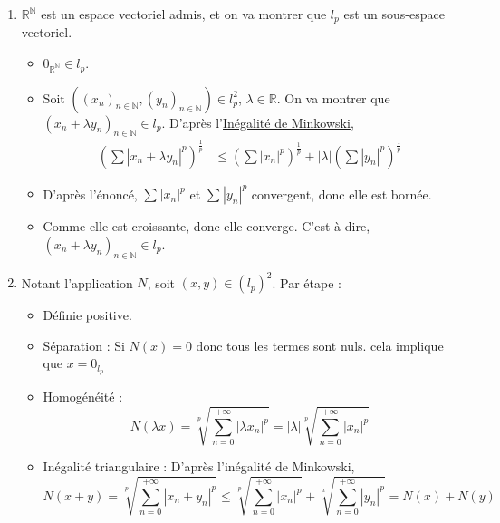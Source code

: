 \begin{solution}
    \begin{enumerate}
      \item $\mathbb{R} ^{\mathbb{N}}$ est un espace vectoriel admis, et on va montrer que $l_p$ est un sous-espace vectoriel. 
        \begin{itemize}
      \item $0 _{\mathbb{R}^{\mathbb{N}}} \in l_p$. 

      \item Soit $((x_n)_{n \in \mathbb{N}}, (y_n)_{n \in \mathbb{N}}) \in l_p ^{2}$, $\lambda \in \mathbb{R}$. On va montrer que $(x_n + \lambda y_n) _{n \in \mathbb{N}} \in l_p$. D'après l'\href{https://fr.wikipedia.org/wiki/Inégalité_de_Minkowski}{Inégalité de Minkowski}, 
   \begin{align*}
   \left(\sum |x_n + \lambda y_n|^p\right)^{\frac{1}{p}} &\leq \left(\sum |x_n|^p\right)^{\frac{1}{p}} + |\lambda|\left(\sum |y_n|^p\right)^{\frac{1}{p}}
   \end{align*}

 \item  D'après l'énoncé, $\sum_{}^{}|x_n| ^{p}$ et $\sum_{}^{}|y_n| ^{p}$ convergent, donc elle est bornée. 

\item Comme elle est croissante, donc elle converge. C'est-à-dire, $(x_n+ \lambda y_n) _{n \in \mathbb{N}} \in l_p$.
        \end{itemize}
      \item Notant l'application $N$, soit $(x,y) \in (l_p) ^{2}$. Par étape :
        \begin{itemize}
          \item Définie positive.

            \item Séparation : Si $N(x) = 0$ donc tous les termes sont nuls. cela implique que $x = 0 _{l_p}$

            \item Homogénéité : $$N(\lambda x) = \sqrt[p]{\sum_{n=0}^{+ \infty}|\lambda x_n| ^{p}} = |\lambda| \sqrt[p]{\sum_{n=0}^{+ \infty}|x_n| ^{p}}$$

            \item Inégalité triangulaire : D'après l'inégalité de Minkowski,
              \begin{equation}
                N(x+ y) = \sqrt[p]{\sum_{n=0}^{+\infty}|x_n + y_n| ^{p}} \le \sqrt[p]{\sum_{n=0}^{+ \infty} |x_n| ^{p}}+ \sqrt[x]{\sum_{n=0}^{+\infty}|y_n| ^{p}} = N(x) + N(y)
              \end{equation}


\end{itemize}
\end{enumerate}
\end{solution}
